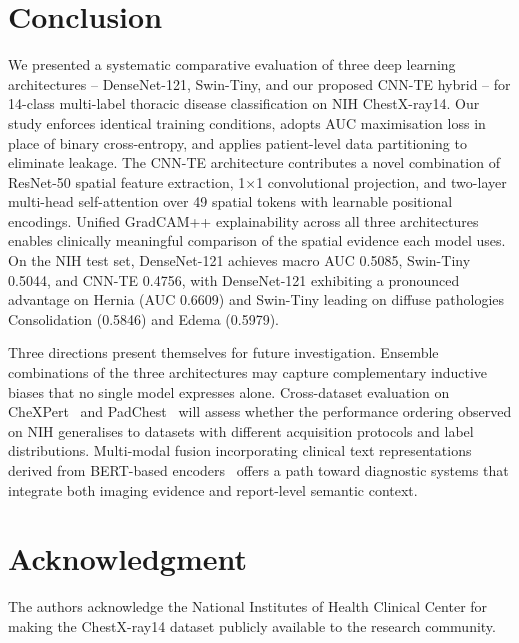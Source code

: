 \documentclass[conference]{IEEEtran}
\begin{document}
\section{Conclusion}

We presented a systematic comparative evaluation of three deep learning
architectures -- DenseNet-121, Swin-Tiny, and our proposed CNN-TE
hybrid -- for 14-class multi-label thoracic disease classification on
NIH ChestX-ray14. Our study enforces identical training conditions,
adopts AUC maximisation loss in place of binary cross-entropy, and
applies patient-level data partitioning to eliminate leakage. The
CNN-TE architecture contributes a novel combination of ResNet-50 spatial
feature extraction, 1$\times$1 convolutional projection, and two-layer
multi-head self-attention over 49 spatial tokens with learnable
positional encodings. Unified GradCAM++ explainability across all three
architectures enables clinically meaningful comparison of the spatial
evidence each model uses. On the NIH test set, DenseNet-121 achieves
macro AUC 0.5085, Swin-Tiny 0.5044, and CNN-TE 0.4756, with
DenseNet-121 exhibiting a pronounced advantage on Hernia (AUC 0.6609)
and Swin-Tiny leading on diffuse pathologies Consolidation (0.5846)
and Edema (0.5979).

Three directions present themselves for future investigation.
Ensemble combinations of the three architectures may capture
complementary inductive biases that no single model expresses alone.
Cross-dataset evaluation on CheXPert~\cite{irvin2019} and
PadChest~\cite{bustos2020} will assess whether the performance
ordering observed on NIH generalises to datasets with different
acquisition protocols and label distributions. Multi-modal fusion
incorporating clinical text representations derived from BERT-based
encoders~\cite{devlin2019} offers a path toward diagnostic systems
that integrate both imaging evidence and report-level semantic context.

\section*{Acknowledgment}

The authors acknowledge the National Institutes of Health Clinical
Center for making the ChestX-ray14 dataset publicly available to the
research community.
\end{document}
